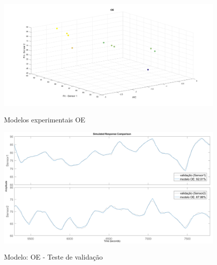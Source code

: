 \begin{apendicesenv}
\begin{figure}[h]
	\caption{Modelos experimentais OE}
	\begin{center}
		\includegraphics[width=1.00\textwidth]{./5_images/tclabsp-models-OE.png} 
		\label{fig:tclabsp-models-oe}
	\end{center}
	\centering
\end{figure}

\begin{figure}
	\caption{Modelo: OE - Teste de validação}
	\begin{center}
		\includegraphics[width=1.00\textwidth]{./5_images/tclabsp-models-OE-compare.png} 
		\label{fig:tclabsp-models-oe-compare}
	\end{center}
	\centering
\end{figure}


\end{apendicesenv}
